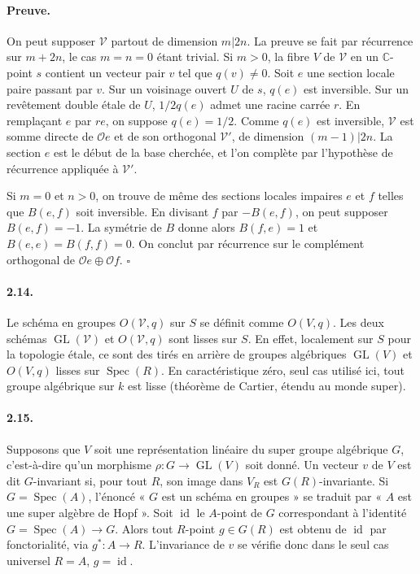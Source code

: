 \documentclass[11pt]{article}
\newcommand{\C}{\mathbb C}
\newcommand{\Spec}{\operatorname{Spec}}
\newcommand{\GL}{\operatorname{GL}}
\newcommand{\id}{\operatorname{id}}
\newcommand{\calO}{\mathcal O}
\begin{document}
\paragraph{Preuve.}
On peut supposer $\mathcal V$ partout de dimension $m|2n$. La preuve se fait par récurrence sur $m+2n$, le cas $m=n=0$ étant trivial. Si $m>0$, la fibre $V$ de $\mathcal V$ en un $\C$-point $s$ contient un vecteur pair $v$ tel que $q(v)\ne0$. Soit $e$ une section locale paire passant par $v$. Sur un voisinage ouvert $U$ de $s$, $q(e)$ est inversible. Sur un revêtement double étale de $U$, $1/2q(e)$ admet une racine carrée $r$. En remplaçant $e$ par $re$, on suppose $q(e)=1/2$. Comme $q(e)$ est inversible, $\mathcal V$ est somme directe de $\calO e$ et de son orthogonal $\mathcal V'$, de dimension $(m-1)|2n$. La section $e$ est le début de la base cherchée, et l'on complète par l'hypothèse de récurrence appliquée à $\mathcal V'$.

Si $m=0$ et $n>0$, on trouve de même des sections locales impaires $e$ et $f$ telles que $B(e,f)$ soit inversible. En divisant $f$ par $-B(e,f)$, on peut supposer $B(e,f)=-1$. La symétrie de $B$ donne alors $B(f,e)=1$ et $B(e,e)=B(f,f)=0$. On conclut par récurrence sur le complément orthogonal de $\calO e\oplus\calO f$. \hfill $\square$

\paragraph{2.14.}
Le schéma en groupes $O(\mathcal V,q)$ sur $S$ se définit comme $O(V,q)$. Les deux schémas $\GL(\mathcal V)$ et $O(\mathcal V,q)$ sont lisses sur $S$. En effet, localement sur $S$ pour la topologie étale, ce sont des tirés en arrière de groupes algébriques $\GL(V)$ et $O(V,q)$ lisses sur $\Spec(R)$. En caractéristique zéro, seul cas utilisé ici, tout groupe algébrique sur $k$ est lisse (théorème de Cartier, étendu au monde super).

\paragraph{2.15.}
Supposons que $V$ soit une représentation linéaire du super groupe algébrique $G$, c'est-à-dire qu'un morphisme $\rho:G\to\GL(V)$ soit donné. Un vecteur $v$ de $V$ est dit $G$-invariant si, pour tout $R$, son image dans $V_R$ est $G(R)$-invariante. Si $G=\Spec(A)$, l'énoncé « $G$ est un schéma en groupes » se traduit par « $A$ est une super algèbre de Hopf ». Soit $\id$ le $A$-point de $G$ correspondant à l'identité $G=\Spec(A)\to G$. Alors tout $R$-point $g\in G(R)$ est obtenu de $\id$ par fonctorialité, via $g^*:A\to R$. L'invariance de $v$ se vérifie donc dans le seul cas universel $R=A$, $g=\id$.
\end{document}

